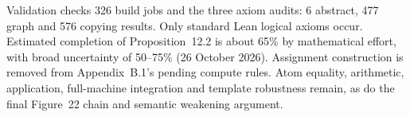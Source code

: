 
Validation checks 326 build jobs and the three axiom audits: 6 abstract,
477 graph and 576 copying results. Only standard Lean logical axioms occur.
Estimated completion of Proposition~12.2 is about 65\% by mathematical effort,
with broad uncertainty of 50--75\% (26 October 2026). Assignment construction
is removed from Appendix~B.1's pending compute rules. Atom equality,
arithmetic, application, full-machine integration and template robustness
remain, as do the final Figure~22 chain and semantic weakening argument.


